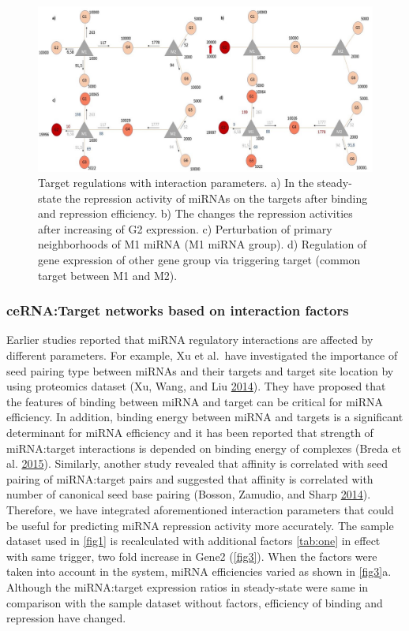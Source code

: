 \documentclass[]{article}
\begin{document}
\begin{figure}
\hypertarget{fig3}{%
\centering
\includegraphics{Fig3.jpg}
\caption{Target regulations with interaction parameters. a) In the
steady-state the repression activity of miRNAs on the targets after
binding and repression efficiency. b) The changes the repression
activities after increasing of G2 expression. c) Perturbation of primary
neighborhoods of M1 miRNA (M1 miRNA group). d) Regulation of gene
expression of other gene group via triggering target (common target
between M1 and M2).}\label{fig3}
}
\end{figure}

\hypertarget{cernatarget-networks-based-on-interaction-factors}{%
\subsubsection{ceRNA:Target networks based on interaction
factors}\label{cernatarget-networks-based-on-interaction-factors}}

Earlier studies reported that miRNA regulatory interactions are affected
by different parameters. For example, Xu et al.~have investigated the
importance of seed pairing type between miRNAs and their targets and
target site location by using proteomics dataset (Xu, Wang, and Liu
\protect\hyperlink{ref-xu_characterization_2014}{2014}). They have
proposed that the features of binding between miRNA and target can be
critical for miRNA efficiency. In addition, binding energy between miRNA
and targets is a significant determinant for miRNA efficiency and it has
been reported that strength of miRNA:target interactions is depended on
binding energy of complexes (Breda et al.
\protect\hyperlink{ref-breda_quantifying_2015}{2015}). Similarly,
another study revealed that affinity is correlated with seed pairing of
miRNA:target pairs and suggested that affinity is correlated with number
of canonical seed base pairing (Bosson, Zamudio, and Sharp
\protect\hyperlink{ref-bosson_endogenous_2014}{2014}). Therefore, we
have integrated aforementioned interaction parameters that could be
useful for predicting miRNA repression activity more accurately. The
sample dataset used in \autoref{fig1} is recalculated with additional
factors \autoref{tab:one} in effect with same trigger, two fold increase
in Gene2 (\autoref{fig3}). When the factors were taken into account in
the system, miRNA efficiencies varied as shown in \autoref{fig3}a.
Although the miRNA:target expression ratios in steady-state were same in
comparison with the sample dataset without factors, efficiency of
binding and repression have changed.
\end{document}
